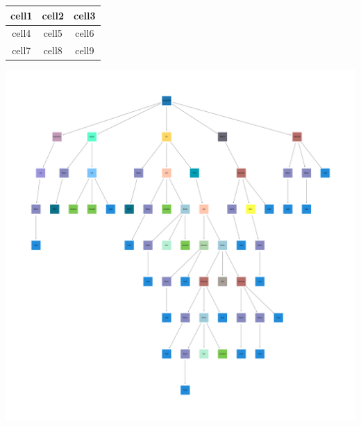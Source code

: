 \documentclass{article}
\begin{document}
\begin{center}
\begin{tabular}{ |c|c|c| }
\hline
cell1 & cell2 & cell3 \\
\hline
cell4 & cell5 & cell6 \\
\hline
cell7 & cell8 & cell9 \\
\hline
\end{tabular}
\end{center}
\includegraphics[width=\textwidth]{ fib_ast.png }
\end{document}
